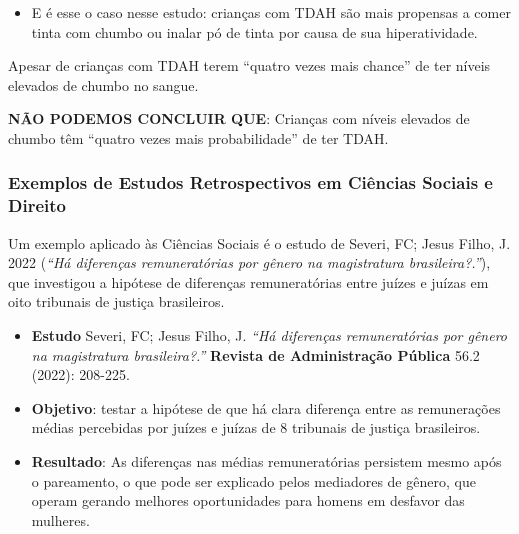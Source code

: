 \documentclass[
  letterpaper,
  DIV=11,
  numbers=noendperiod]{scrreprt}
\providecommand{\tightlist}{%
  \setlength{\itemsep}{0pt}\setlength{\parskip}{0pt}}
\begin{document}
\begin{itemize}
\tightlist
\item
  E é esse o caso nesse estudo: crianças com TDAH são mais propensas a
  comer tinta com chumbo ou inalar pó de tinta por causa de sua
  hiperatividade.
\end{itemize}

\begin{tcolorbox}[enhanced jigsaw, leftrule=.75mm, coltitle=black, colframe=quarto-callout-warning-color-frame, toprule=.15mm, opacitybacktitle=0.6, bottomtitle=1mm, bottomrule=.15mm, titlerule=0mm, toptitle=1mm, title=\textcolor{quarto-callout-warning-color}{\faExclamationTriangle}\hspace{0.5em}{Cuidado}, arc=.35mm, breakable, opacityback=0, colbacktitle=quarto-callout-warning-color!10!white, colback=white, left=2mm, rightrule=.15mm]

Apesar de crianças com TDAH terem ``quatro vezes mais chance'' de ter
níveis elevados de chumbo no sangue.

\textbf{NÃO PODEMOS CONCLUIR QUE}: Crianças com níveis elevados de
chumbo têm ``quatro vezes mais probabilidade'' de ter TDAH.

\end{tcolorbox}

\subsubsection{Exemplos de Estudos Retrospectivos em Ciências Sociais e
Direito}\label{exemplos-de-estudos-retrospectivos-em-ciuxeancias-sociais-e-direito}

Um exemplo aplicado às Ciências Sociais é o estudo de Severi, FC; Jesus
Filho, J. 2022 (\emph{``Há diferenças remuneratórias por gênero na
magistratura brasileira?.''}), que investigou a hipótese de diferenças
remuneratórias entre juízes e juízas em oito tribunais de justiça
brasileiros.

\begin{itemize}
\item
  \textbf{Estudo} Severi, FC; Jesus Filho, J. \emph{``Há diferenças
  remuneratórias por gênero na magistratura brasileira?.''}
  \textbf{Revista de Administração Pública} 56.2 (2022): 208-225.
\item
  \textbf{Objetivo}: testar a hipótese de que há clara diferença entre
  as remunerações médias percebidas por juízes e juízas de 8 tribunais
  de justiça brasileiros.
\item
  \textbf{Resultado}: As diferenças nas médias remuneratórias persistem
  mesmo após o pareamento, o que pode ser explicado pelos mediadores de
  gênero, que operam gerando melhores oportunidades para homens em
  desfavor das mulheres.
\end{itemize}
\end{document}
